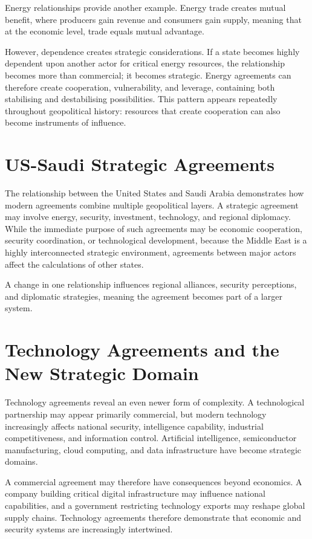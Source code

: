 \documentclass[11pt,openany]{book}
\theoremstyle{plain}
\theoremstyle{definition}
\begin{document}
Energy relationships provide another example. Energy trade creates mutual benefit, where producers gain revenue and consumers gain supply, meaning that at the economic level, trade equals mutual advantage. 

However, dependence creates strategic considerations. If a state becomes highly dependent upon another actor for critical energy resources, the relationship becomes more than commercial; it becomes strategic. Energy agreements can therefore create cooperation, vulnerability, and leverage, containing both stabilising and destabilising possibilities. This pattern appears repeatedly throughout geopolitical history: resources that create cooperation can also become instruments of influence.

\section*{US-Saudi Strategic Agreements}

The relationship between the United States and Saudi Arabia demonstrates how modern agreements combine multiple geopolitical layers. A strategic agreement may involve energy, security, investment, technology, and regional diplomacy. While the immediate purpose of such agreements may be economic cooperation, security coordination, or technological development, because the Middle East is a highly interconnected strategic environment, agreements between major actors affect the calculations of other states.

A change in one relationship influences regional alliances, security perceptions, and diplomatic strategies, meaning the agreement becomes part of a larger system.

\section*{Technology Agreements and the New Strategic Domain}

Technology agreements reveal an even newer form of complexity. A technological partnership may appear primarily commercial, but modern technology increasingly affects national security, intelligence capability, industrial competitiveness, and information control. Artificial intelligence, semiconductor manufacturing, cloud computing, and data infrastructure have become strategic domains.

A commercial agreement may therefore have consequences beyond economics. A company building critical digital infrastructure may influence national capabilities, and a government restricting technology exports may reshape global supply chains. Technology agreements therefore demonstrate that economic and security systems are increasingly intertwined.
\end{document}
